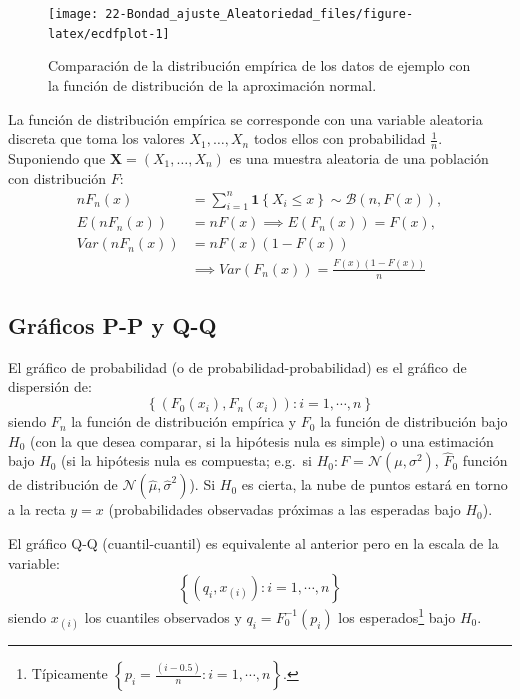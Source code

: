 \documentclass[
  10pt,
]{book}
\renewcommand{\mathbf}[1]{\symbf{#1}}
\theoremstyle{break}
\theoremstyle{nonumberplain}
\let\oldfootnote\footnote
\renewcommand\footnote[1]{\oldfootnote{\hspace{2mm}#1}}
\begin{document}
\begin{figure}[!htbp]

{\centering \texttt{[image: 22-Bondad\_ajuste\_Aleatoriedad\_files/figure-latex/ecdfplot-1]} 

}

\caption{Comparación de la distribución empírica de los datos de ejemplo con la función de distribución de la aproximación normal.}\label{fig:ecdfplot}
\end{figure}

La función de distribución empírica se corresponde con una variable aleatoria discreta que toma los valores
\(X_1,\ldots ,X_n\) todos ellos con probabilidad \(\frac{1}{n}\).
Suponiendo que \(\mathbf{X}=\left( X_1,\ldots ,X_n \right)\) es una muestra aleatoria de una población con distribución \(F\):
\[\begin{aligned}
nF_n\left( x \right) &= \sum_{i=1}^{n}\mathbf{1}\left\{ X_i\leq x\right\}
\sim \mathcal{B}\left( n,F\left( x \right) \right), \\
E\left( nF_n\left( x \right) \right) &= nF\left( x \right) \implies E\left(
F_n\left( x \right) \right) =F\left( x \right), \\
Var\left( nF_n\left( x \right) \right) &=  nF\left( x \right) \left(
1-F\left( x \right) \right) \\
&\implies  Var\left( F_n\left( x \right) \right) =\frac{F\left( x \right) \left( 1-F\left( x \right) \right)}{n}
\end{aligned}\]

\hypertarget{gruxe1ficos-p-p-y-q-q}{%
\subsection{Gráficos P-P y Q-Q}\label{gruxe1ficos-p-p-y-q-q}}

El gráfico de probabilidad (o de probabilidad-probabilidad) es el gráfico de dispersión de:
\[\left \{  \left( F_0(x_{i}), F_n(x_{i}) \right)  :i=1,\cdots,n\right \}\]
siendo \(F_n\) la función de distribución empírica y \(F_0\) la función de distribución bajo \(H_0\) (con la que desea comparar, si la hipótesis nula es simple) o una estimación bajo \(H_0\) (si la hipótesis nula es compuesta; e.g.~si \(H_0:F= \mathcal{N}(\mu,\sigma^2)\),
\(\hat{F}_0\) función de distribución de \(\mathcal{N}(\hat{\mu},\hat{\sigma}^2)\)).
Si \(H_0\) es cierta, la nube de puntos estará en torno a la recta \(y=x\) (probabilidades observadas próximas a las esperadas bajo \(H_0\)).

El gráfico Q-Q (cuantil-cuantil) es equivalente al anterior pero en la escala de la variable:
\[\left\{ \left( q_{i}, x_{(i)}\right) : i=1, \cdots, n \right\}\]
siendo \(x_{(i)}\) los cuantiles observados y \(q_{i}=F_0^{-1}(p_{i})\) los esperados\footnote{Típicamente \(\left \{ p_{i}=\frac{\left(i-0.5 \right)}n : i=1, \cdots, n \right\}\).} bajo \(H_0\).
\end{document}
